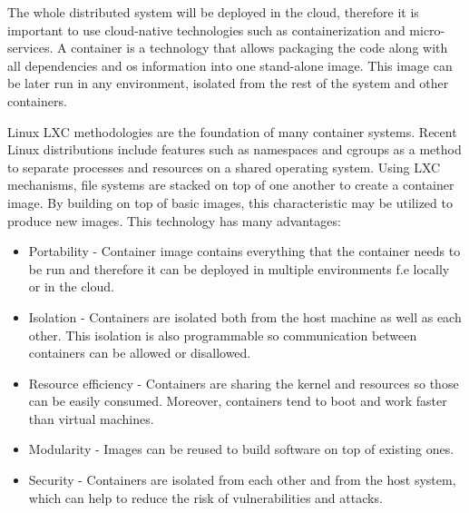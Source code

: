 The whole distributed system will be deployed in the cloud, therefore it is important to use cloud-native technologies such as containerization and micro-services. A container is a technology that allows packaging the code along with all dependencies and os information into one stand-alone image. This image can be later run in any environment, isolated from the rest of the system and other containers\cite{container_technologies}.

Linux LXC methodologies are the foundation of many container systems. Recent Linux distributions include features such as namespaces and cgroups as a method to separate processes and resources on a shared operating system. Using LXC mechanisms, file systems are stacked on top of one another to create a container image. By building on top of basic images, this characteristic may be utilized to produce new images\cite{container_technologies}. This technology has many advantages:
\begin{itemize}
    \item Portability - Container image contains everything that the container needs to be run and therefore it can be deployed in multiple environments f.e locally or in the cloud.

    \item  Isolation - Containers are isolated both from the host machine as well as each other. This isolation is also programmable so communication between containers can be allowed or disallowed.

    \item Resource efficiency - Containers are sharing the kernel and resources so those can be easily consumed. Moreover, containers tend to boot and work faster than virtual machines.
    
    \item Modularity - Images can be reused to build software on top of existing ones.
    
    \item Security - Containers are isolated from each other and from the host system, which can help to reduce the risk of vulnerabilities and attacks.
\end{itemize}